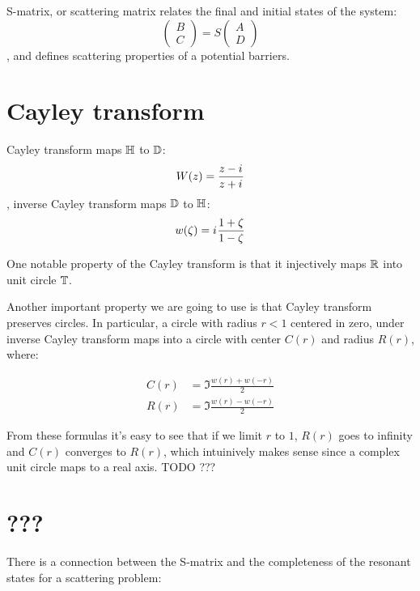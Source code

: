 S-matrix, or scattering matrix relates the final and initial states of the system:
\begin{equation}\label{eq:smatrix}
\begin{pmatrix} B \\ C \end{pmatrix} = S \begin{pmatrix} A \\ D \end{pmatrix}
\end{equation}
, and defines scattering properties of a potential barriers.

\section{Cayley transform}

Cayley transform maps $\mathbb{H}$ to $\mathbb{D}$:
\begin{equation}\label{eq:cayley}
W(z) = \frac{z - \iu}{z + \iu}
\end{equation}
, inverse Cayley transform maps $\mathbb{D}$ to $\mathbb{H}$:
\begin{equation}\label{eq:cayley_inverse}
w(\zeta) = \iu \frac{1 + \zeta}{1 - \zeta}
\end{equation}

One notable property of the Cayley transform is that it injectively maps $\mathbb{R}$ into unit circle $\mathbb{T}$.

Another important property we are going to use is that Cayley transform preserves circles. In particular, a circle with radius $r < 1$ centered in zero, under inverse Cayley transform maps into a circle with center $C(r)$ and radius $R(r)$, where:

\begin{equation}\label{eq:c_and_r}
\begin{aligned}
   C(r) &= \Im \frac{w(r) + w(-r)}{2}
\\ R(r) &= \Im \frac{w(r) - w(-r)}{2}
\end{aligned}
\end{equation}

From these formulas it's easy to see that if we limit $r$ to $1$, $R(r)$ goes to infinity and $C(r)$ converges to $R(r)$, which intuinively makes sense since a complex unit circle maps to a real axis. TODO ???

\section{???}
There is a connection between the S-matrix and the completeness of the resonant states for a scattering problem:

